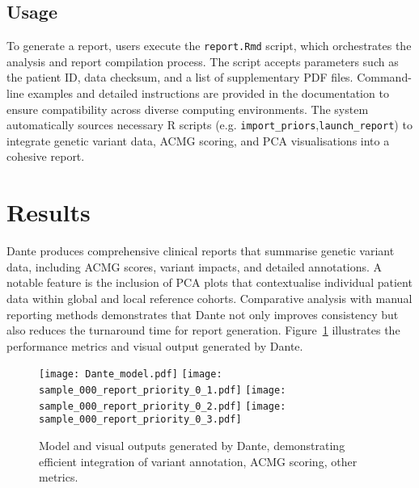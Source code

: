 \subsection{Usage}
\noindent
To generate a report, users execute the \texttt{report.Rmd} script, which orchestrates the analysis and report compilation process. The script accepts parameters such as the patient ID, data checksum, and a list of supplementary PDF files. Command-line examples and detailed instructions are provided in the documentation to ensure compatibility across diverse computing environments. The system automatically sources necessary R scripts (e.g. \texttt{import\_priors},\texttt{launch\_report}) to integrate genetic variant data, ACMG scoring, and PCA visualisations into a cohesive report.

\section{Results}
\noindent
Dante produces comprehensive clinical reports that summarise genetic variant data, including ACMG scores, variant impacts, and detailed annotations. A notable feature is the inclusion of PCA plots that contextualise individual patient data within global and local reference cohorts. Comparative analysis with manual reporting methods demonstrates that Dante not only improves consistency but also reduces the turnaround time for report generation. Figure~\ref{fig:performance} illustrates the performance metrics and visual output generated by Dante.

\begin{figure}[ht]
    \centering
    \texttt{[image: Dante\_model.pdf]}
    \texttt{[image: sample\_000\_report\_priority\_0\_1.pdf]}
   \texttt{[image: sample\_000\_report\_priority\_0\_2.pdf]}
  \texttt{[image: sample\_000\_report\_priority\_0\_3.pdf]}
    \caption{Model and visual outputs generated by Dante, demonstrating efficient integration of variant annotation, ACMG scoring, other metrics.}
    \label{fig:performance}
\end{figure}


